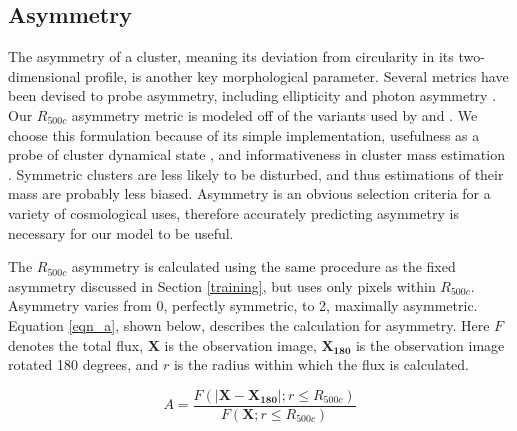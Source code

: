 \subsection{Asymmetry}\label{asymmetry}
The asymmetry of a cluster, meaning its deviation from circularity in its two-dimensional profile, is another key morphological parameter. Several metrics have been devised to probe asymmetry, including ellipticity and photon asymmetry \cite[see][]{Ghirardini_2022}. Our $R_{500c}$ asymmetry metric is modeled off of the variants used by \cite{Rasia_2013} and \cite{Green_2019}. We choose this formulation because of its simple implementation, usefulness as a probe of cluster dynamical state \cite{Rasia_2013}, and informativeness in cluster mass estimation \cite{Green_2019}. Symmetric clusters are less likely to be disturbed, and thus estimations of their mass are probably less biased. Asymmetry is an obvious selection criteria for a variety of cosmological uses, therefore accurately predicting asymmetry is necessary for our model to be useful.%

The $R_{500c}$ asymmetry is calculated using the same procedure as the fixed asymmetry discussed in Section \ref{training}, but uses only pixels within $R_{500c}$. Asymmetry varies from 0, perfectly symmetric, to 2, maximally asymmetric. Equation \ref{eqn_a}, shown below, describes the calculation for asymmetry. Here $F$ denotes the total flux, $\mathbf{X}$ is the observation image, $\mathbf{X_{180}}$ is the observation image rotated 180 degrees, and $r$ is the radius within which the flux is calculated.

\begin{equation}\label{eqn_a}
    A = \frac{F(|\mathbf{X}-\mathbf{X_{180}}|;r\leq R_{500c})}{F(\mathbf{X};r\leq R_{500c})}
\end{equation}

